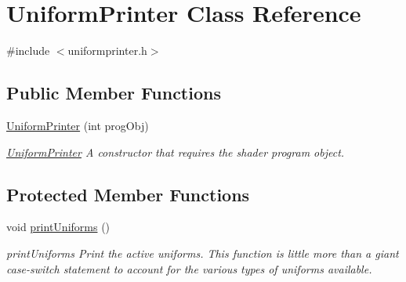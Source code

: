 \hypertarget{classUniformPrinter}{}\section{Uniform\+Printer Class Reference}
\label{classUniformPrinter}


{\ttfamily \#include $<$uniformprinter.\+h$>$}

\subsection*{Public Member Functions}
\begin{DoxyCompactItemize}
\item 
\mbox{\label{classUniformPrinter_aae4f47e6ef97af7ee35be6df54e59ab4}} 
\hyperlink{classUniformPrinter_aae4f47e6ef97af7ee35be6df54e59ab4}{Uniform\+Printer} (int prog\+Obj)
\begin{DoxyCompactList}\small\item\em \hyperlink{classUniformPrinter}{Uniform\+Printer} A constructor that requires the shader program object. \end{DoxyCompactList}\end{DoxyCompactItemize}
\subsection*{Protected Member Functions}
\begin{DoxyCompactItemize}
\item 
\mbox{\label{classUniformPrinter_a54a28c69fee2cd5976b2fe725132f85d}} 
void \hyperlink{classUniformPrinter_a54a28c69fee2cd5976b2fe725132f85d}{print\+Uniforms} ()
\begin{DoxyCompactList}\small\item\em print\+Uniforms Print the active uniforms. This function is little more than a giant case-\/switch statement to account for the various types of uniforms available. \end{DoxyCompactList}\end{DoxyCompactItemize}
